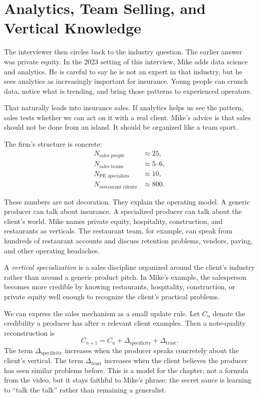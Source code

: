 \section{Analytics, Team Selling, and Vertical Knowledge}

The interviewer then circles back to the industry question. The earlier answer was private equity. In the 2023 setting of this interview, Mike adds data science and analytics. He is careful to say he is not an expert in that industry, but he sees analytics as increasingly important for insurance. Young people can crunch data, notice what is trending, and bring those patterns to experienced operators.

That naturally leads into insurance sales. If analytics helps us see the pattern, sales tests whether we can act on it with a real client. Mike's advice is that sales should not be done from an island. It should be organized like a team sport.

The firm's structure is concrete:
\begin{align}
N_{\text{sales people}} &\approx 25,\\
N_{\text{sales teams}} &\approx 5\text{--}6,\\
N_{\text{PE specialists}} &\approx 10,\\
N_{\text{restaurant clients}} &\approx 800.
\end{align}

These numbers are not decoration. They explain the operating model. A generic producer can talk about insurance. A specialized producer can talk about the client's world. Mike names private equity, hospitality, construction, and restaurants as verticals. The restaurant team, for example, can speak from hundreds of restaurant accounts and discuss retention problems, vendors, paving, and other operating headaches.

\begin{definition}
A \emph{vertical specialization} is a sales discipline organized around the client's industry rather than around a generic product pitch. In Mike's example, the salesperson becomes more credible by knowing restaurants, hospitality, construction, or private equity well enough to recognize the client's practical problems.
\end{definition}

We can express the sales mechanism as a small update rule. Let \(C_n\) denote the credibility a producer has after \(n\) relevant client examples. Then a note-quality reconstruction is
\begin{equation}
C_{n+1}
=
C_n
+
\Delta_{\text{specificity}}
+
\Delta_{\text{trust}}.
\end{equation}
The term \(\Delta_{\text{specificity}}\) increases when the producer speaks concretely about the client's vertical. The term \(\Delta_{\text{trust}}\) increases when the client believes the producer has seen similar problems before. This is a model for the chapter, not a formula from the video, but it stays faithful to Mike's phrase: the secret sauce is learning to ``talk the talk'' rather than remaining a generalist.

